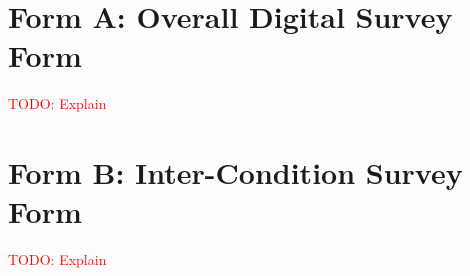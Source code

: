 \section{Form A: Overall Digital Survey Form}
\textcolor{Red}{TODO: Explain}

\section{Form B: Inter-Condition Survey Form}
\textcolor{Red}{TODO: Explain}
